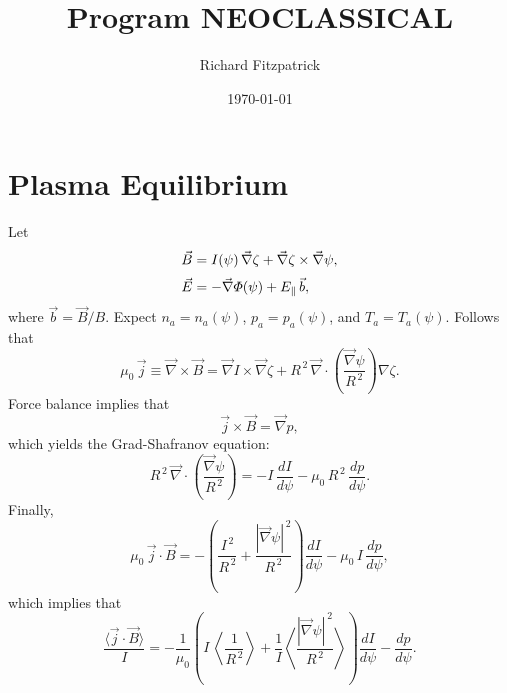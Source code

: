 \documentclass[12pt]{article}
\title{\bf Program NEOCLASSICAL}
\date{\today}
\author{Richard Fitzpatrick}
\begin{document}
\maketitle


\section{Plasma Equilibrium}
Let
\begin{align}
\vec{B} &= I(\psi)\,\vec{\nabla} \zeta + \vec{\nabla}\zeta\times \vec{\nabla}\psi,\\[0.5ex]
\vec{E} &= -\vec{\nabla}{\mit\Phi}(\psi) + E_\parallel\,\vec{b}, 
\end{align}
where $\vec{b}=\vec{B}/B$.
Expect $n_a=n_a(\psi)$, $p_a=p_a(\psi)$, and $T_a= T_a(\psi)$.
Follows that
\begin{equation}
\mu_0\,\vec{j} \equiv \vec{\nabla}\times \vec{B} = \vec{\nabla}I \times \vec{\nabla}\zeta + R^{\,2}\,\vec{\nabla}\cdot\left(\frac{\vec{\nabla}\psi}{R^{\,2}}\right)\nabla\zeta.
\end{equation}
Force balance implies that
\begin{equation}
\vec{j}\times \vec{B} = \vec{\nabla} p,
\end{equation}
which yields the Grad-Shafranov equation:
\begin{equation}
R^{\,2}\,\vec{\nabla}\cdot\left(\frac{\vec{\nabla}\psi}{R^{\,2}}\right) = - I\,\frac{dI}{d\psi} -\mu_0\,R^{\,2}\,\frac{dp}{d\psi}.
\end{equation}
Finally,
\begin{equation}
\mu_0\,\vec{j}\cdot\vec{B} = -\left(\frac{I^{\,2}}{R^{\,2}} + \frac{|\vec{\nabla}\psi|^{\,2}}{R^{\,2}}\right)\frac{dI}{d\psi}
-\mu_0\, I\,\frac{dp}{d\psi},
\end{equation}
which implies that
\begin{equation}
\frac{\langle \vec{j}\cdot\vec{B}\rangle}{I} = -\frac{1}{\mu_0}\left(I\,\left\langle\frac{1}{R^{\,2}}\right\rangle + \frac{1}{I}\left\langle
\frac{|\vec{\nabla}\psi|^{\,2}}{R^{\,2}}\right\rangle\right)\frac{dI}{d\psi}-\frac{dp}{d\psi}.
\end{equation}
\end{document}
